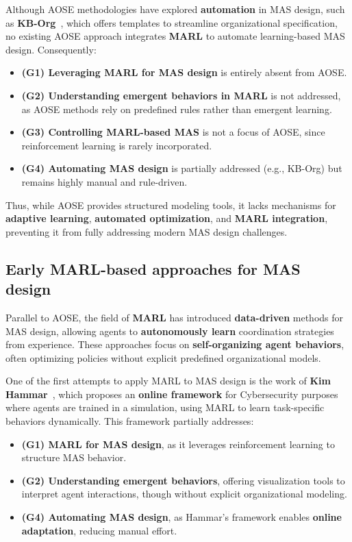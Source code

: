 \documentclass[pdflatex,sn-mathphys-num]{sn-jnl}%
\theoremstyle{thmstyleone}%
\theoremstyle{thmstyletwo}%
\theoremstyle{thmstylethree}%
\begin{document}
Although AOSE methodologies have explored \textbf{automation} in MAS design, such as \textbf{KB-Org}~\cite{kborg2001}, which offers templates to streamline organizational specification, no existing AOSE approach integrates \textbf{MARL} to automate learning-based MAS design. Consequently:
%
\begin{itemize}
    \item \textbf{(G1) Leveraging MARL for MAS design} is entirely absent from AOSE.
    \item \textbf{(G2) Understanding emergent behaviors in MARL} is not addressed, as AOSE methods rely on predefined rules rather than emergent learning.
    \item \textbf{(G3) Controlling MARL-based MAS} is not a focus of AOSE, since reinforcement learning is rarely incorporated.
    \item \textbf{(G4) Automating MAS design} is partially addressed (e.g., KB-Org) but remains highly manual and rule-driven.
\end{itemize}

Thus, while AOSE provides structured modeling tools, it lacks mechanisms for \textbf{adaptive learning}, \textbf{automated optimization}, and \textbf{MARL integration}, preventing it from fully addressing modern MAS design challenges.

\subsection{Early MARL-based approaches for MAS design}

Parallel to AOSE, the field of \textbf{MARL} has introduced \textbf{data-driven} methods for MAS design, allowing agents to \textbf{autonomously learn} coordination strategies from experience. These approaches focus on \textbf{self-organizing agent behaviors}, often optimizing policies without explicit predefined organizational models.

One of the first attempts to apply MARL to MAS design is the work of \textbf{Kim Hammar}~\cite{hammar2019}, which proposes an \textbf{online framework} for Cybersecurity purposes where agents are trained in a simulation, using MARL to learn task-specific behaviors dynamically. This framework partially addresses:
%
\begin{itemize}
    \item \textbf{(G1) MARL for MAS design}, as it leverages reinforcement learning to structure MAS behavior.
    \item \textbf{(G2) Understanding emergent behaviors}, offering visualization tools to interpret agent interactions, though without explicit organizational modeling.
    \item \textbf{(G4) Automating MAS design}, as Hammar's framework enables \textbf{online adaptation}, reducing manual effort.
\end{itemize}
\end{document}
